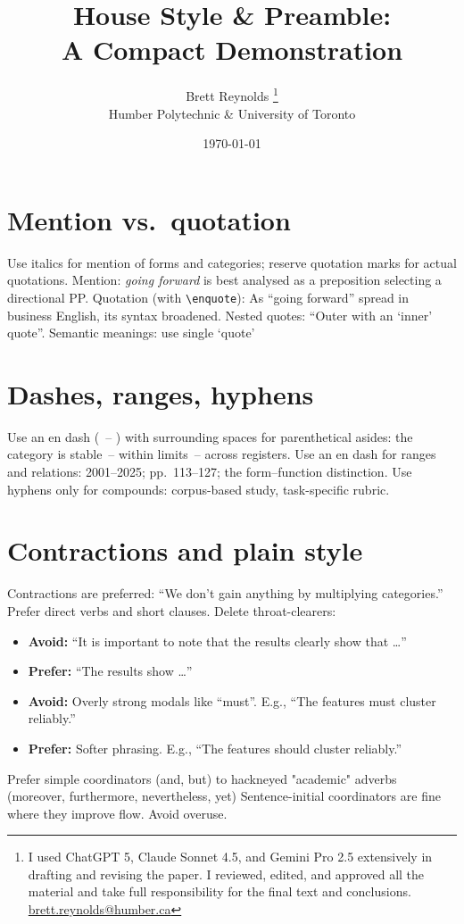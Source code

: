\documentclass[12pt]{article}
\title{House Style \& Preamble:\\A Compact Demonstration}
\author{Brett Reynolds \orcidlink{0000-0003-0073-7195}\thanks{I used ChatGPT 5, Claude Sonnet 4.5, and Gemini Pro 2.5 extensively in drafting and revising the paper. I reviewed, edited, and approved all the material and take full responsibility for the final text and conclusions. \href{mailto:brett.reynolds@humber.ca}{brett.reynolds@humber.ca}}\\
Humber Polytechnic \& University of Toronto}
\date{\today}
\newcommand{\term}[1]{\textit{#1}}
\begin{document}
\maketitle

\section{Mention vs.\ quotation} \label{mention}
Use italics for mention of forms and categories; reserve quotation marks for actual quotations.
Mention: \term{going forward} is best analysed as a preposition selecting a directional PP.
Quotation (with \verb|\enquote|): As \enquote{going forward} spread in business English, its syntax broadened.
Nested quotes: \enquote{Outer with an \enquote{inner} quote}.
Semantic meanings: use single `quote'

\section{Dashes, ranges, hyphens} \label{dashes}
Use an en dash (~-- ) with surrounding spaces for parenthetical asides: the category is stable~-- within limits~-- across registers.
Use an en dash for ranges and relations: 2001--2025; pp.\ 113--127; the form--function distinction.
Use hyphens only for compounds: corpus-based study, task-specific rubric.

\section{Contractions and plain style} \label{contractions}
Contractions are preferred: \enquote{We don’t gain anything by multiplying categories.}
Prefer direct verbs and short clauses. Delete throat-clearers:
\begin{itemize}[nosep]
  \item \textbf{Avoid:} \enquote{It is important to note that the results clearly show that \dots}
  \item \textbf{Prefer:} \enquote{The results show \dots}
  \item \textbf{Avoid:} Overly strong modals like \enquote{must}. E.g., \enquote{The features must cluster reliably.}
  \item \textbf{Prefer:} Softer phrasing. E.g., \enquote{The features should cluster reliably.}
\end{itemize}
Prefer simple coordinators (and, but) to hackneyed "academic" adverbs (moreover, furthermore, nevertheless, yet)
Sentence-initial coordinators are fine where they improve flow. Avoid overuse.
\end{document}
